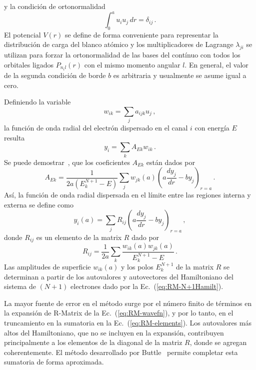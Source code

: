 y la condición de ortonormalidad
\begin{equation}
\int_0^au_iu_j\,dr=\delta_{ij}\,.
\end{equation}
El potencial $V(r)$ se define de forma conveniente para representar la
distribución de carga del blanco atómico y los multiplicadores de 
Lagrange $\lambda_{ji}$ se utilizan para forzar la ortonormalidad de las
bases del contínuo con todos los orbitales ligados $P_{n_il}(r)$ con el
mismo momento angular $l$. En general, el valor de la segunda condición 
de borde $b$ es arbitraria y usualmente se asume igual a cero.

Definiendo la variable
\begin{equation}
w_{ik}=\sum_j a_{ijk}u_j\,,
\end{equation}
la función de onda radial del electrón dispersado en el canal $i$ con 
energía $E$ resulta
\begin{equation}
y_i=\sum_kA_{Ek}w_{ik}\,.
\end{equation}
Se puede demostrar~\cite{Burke:75}, que los coeficientes $A_{Ek}$ 
están dados por
\begin{equation}
A_{Ek}=\frac{1}{2a\left(E_k^{N+1}-E\right)}\sum_jw_{jk}(a)
\left(a\frac{dy_j}{dr}-by_j\right)_{r=a}\,.
\end{equation}
Así, la función de onda radial dispersada en el límite entre las 
regiones interna y externa se define como
\begin{equation}
y_i(a)=\sum_j R_{ij}\left(a\frac{dy_j}{dr}-by_j\right)_{r=a}\,,
\end{equation}
donde $R_{ij}$ es un elemento de la matrix $R$ dado por
\begin{equation}
R_{ij} = \frac{1}{2a}\sum_k\frac{w_{ik}(a)w_{jk}(a)}{E_k^{N+1}-E}\,.
\label{eq:RM-elements}
\end{equation}
Las amplitudes de superficie $w_{ik}(a)$ y los polos $E_k^{N+1}$ de la 
matrix $R$ se determinan a partir de los autovalores y autovectores del 
Hamiltoniano del sistema de $(N+1)$ electrones dado por la 
Ec.~(\ref{eq:RM-N+1Hamilt}).

La mayor fuente de error en el método surge por el número finito de 
términos en la expansión de R-Matrix de la Ec.~(\ref{eq:RM-wavefn}), y 
por lo tanto, en el truncamiento en la sumatoria en la 
Ec.~(\ref{eq:RM-elements}). Los autovalores más altos del Hamiltoniano,
que no se incluyen en la expansión, contribuyen principalmente a los 
elementos de la diagonal de la matriz $R$, donde se agregan 
coherentemente. El método desarrollado por Buttle~\cite{Buttle} permite 
completar esta sumatoria de forma aproximada. 

